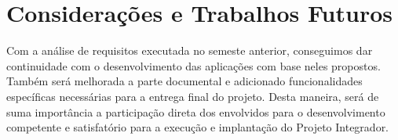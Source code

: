 \chapter{Considerações e Trabalhos Futuros}

{Com a análise de requisitos executada no semeste anterior, conseguimos dar continuidade com o desenvolvimento das aplicações com base neles propostos. Também será melhorada a parte documental e adicionado funcionalidades específicas necessárias para a entrega final do projeto. Desta maneira, será de suma importância a participação direta dos envolvidos para o desenvolvimento competente e satisfatório para a execução e implantação do Projeto Integrador. }

